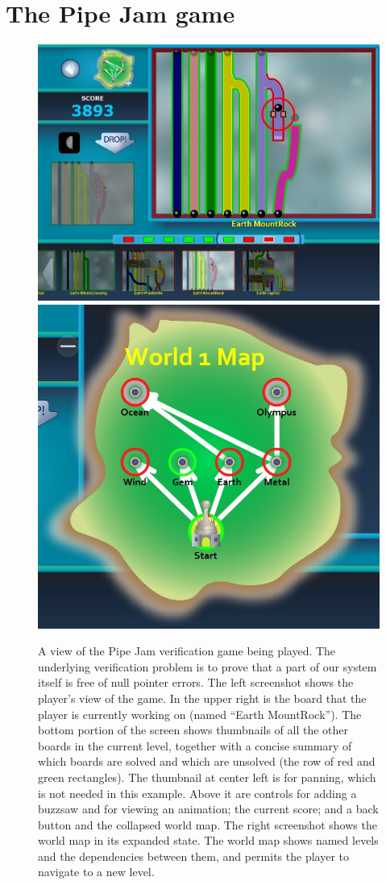 \documentclass[preprint]{sig-alternate}
\begin{document}
\section{The Pipe Jam game}
\label{sec:pipejam}


\begin{figure}
\begin{center}
\includegraphics[width=.49\textwidth]{images/allUI-world1}%
\hspace{10mm}
\includegraphics[width=.35\textwidth]{images/world-map}%
\end{center}

\caption{
  A view of the Pipe Jam verification game being played.  The underlying
  verification problem is to prove that a part of our system itself is free of
  null pointer errors.
  \newline
  The left screenshot shows the player's view of the game.  In the
  upper right is the board that the player is currently working on
  (named ``Earth MountRock'').  The bottom portion of the screen shows
  thumbnails of all the other boards in the current level, together
  with a concise summary of which boards are solved and which are
  unsolved (the row of red and green rectangles).  The thumbnail at
  center left is for panning, which is not needed in this example.
  Above it are controls for adding a buzzsaw and for viewing an
  animation; the current score; and a back button and the collapsed
  world map.
  \newline
  The right screenshot shows the world map in its expanded state.  The
  world map shows named levels and the dependencies between them, and 
  permits the player to navigate to a new level.
}
\label{fig:game-overview}
\end{figure}
\end{document}
